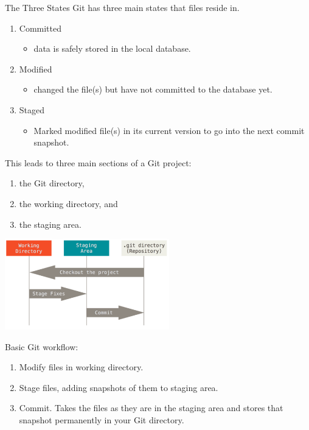 \begin{frame}[t,allowframebreaks]{The Three States}
  Git has three main states that files reside in.

  \begin{enumerate}
    \item Committed
      \begin{itemize}
        \item data is safely stored in the local database.
      \end{itemize}
    \item Modified
      \begin{itemize}
        \item changed the file(s) but have not committed to the database yet.
      \end{itemize}
    \item Staged
      \begin{itemize}
        \item Marked modified file(s) in its current version to go into the next
          commit snapshot.
      \end{itemize}
  \end{enumerate}

  This leads to three main sections of a Git project:
  \begin{enumerate}
    \item the Git directory,
    \item the working directory, and
    \item the staging area.
  \end{enumerate}

  \pagebreak

  \begin{center}
    \includegraphics[height=1.55in]{../images/02-getting-started/areas}
  \end{center}

  Basic Git workflow:
  \begin{enumerate}
    \item Modify files in working directory.
    \item Stage files, adding snapshots of them to staging area.
    \item Commit.  Takes the files as they are in the staging area and stores
      that snapshot permanently in your Git directory.
  \end{enumerate} 
\end{frame}

